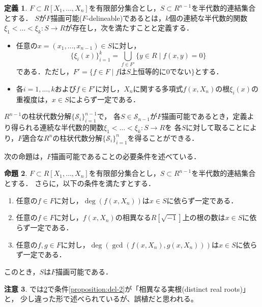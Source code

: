 \documentclass[uplatex, dvipdfmx]{jsarticle}
\numberwithin{equation}{section}
\newcommand{\map}[3]{{#1}\colon{#2}\rightarrow{#3}}
\theoremstyle{definition}
\newtheorem{definition}{定義}[section]
\newtheorem{proposition}[definition]{命題}
\newtheorem{remark}[definition]{注意}
\begin{document}
\begin{definition} 
     $F \subset R[X_1, \dots, X_n]$を有限部分集合とし，$S \subset R^{n-1}$を半代数的連結集合とする．
     $S$が$F$描画可能($F$-delineable)であるとは，$k$個の連続な半代数的関数$\map{\xi_1<\dots<\xi_k}{S}{R}$が存在し，次を満たすことと定義する．
     \begin{itemize}
          \item 任意の$ x = (x_1, \dots, x_{n-1}) \in S $に対し，
          \begin{equation}
               \{\xi_i(x)\}_{i=1}^k = \bigcup_{f \in F'}\{y \in R \mid f(x,y)=0\}
          \end{equation}
          である．ただし，$F' = \{f \in F \mid \text{$f$は$S$上恒等的に$0$でない}\}$とする．
          \item 各$i=1, \dots, k$および$f \in F'$に対し，$X_n$に関する多項式$f(x,X_n)$の根$\xi_i(x)$の重複度は，$x\in S$によらず一定である．
     \end{itemize}
\end{definition}

$R^{n-1}$の柱状代数分解$\{\mathcal{S}_i\}_{i=1}^{n-1}$で，
各$S \in \mathcal{S}_{n-1}$が$F$描画可能であるとき，定義より得られる連続な半代数的関数$\map{\xi_1<\dots<\xi_k}{S}{R}$を
各$S$に対して取ることにより，$F$適合な$R^n$の柱状代数分解$\{\mathcal{S}_i\}_{i=1}^n$を得ることができる．

次の命題は，$F$描画可能であることの必要条件を述べている．

\begin{proposition}\label{proposition:del}
     $F \subset R[X_1, \dots, X_n]$を有限部分集合とし，$S \subset R^{n-1}$を半代数的連結集合とする．
     さらに，以下の条件を満たすとする．
     \begin{enumerate}
          \item \label{proposition:del-1}
          任意の$f \in F$に対し，$\deg(f(x, X_n))$は$x \in S$に依らず一定である．
          \item \label{proposition:del-2}
          任意の$f \in F$に対し，$f(x, X_n)$の相異なる$R[\sqrt{-1}]$上の根の数は$x \in S$に依らず一定である．
          \item \label{proposition:del-3}
          任意の$f, g \in F$に対し，$\deg(\gcd(f(x, X_n), g(x, X_n)))$は$x \in S$に依らず一定である．
     \end{enumerate}
     このとき，$S$は$F$描画可能である．
\end{proposition}

\begin{remark}
     \cite[Proposition 5.14]{MR2248869}では\cref{proposition:del}で条件\ref{proposition:del-2}が「相異なる実根(distinct real roots)」と，
     少し違った形で述べられているが、誤植だと思われる。
\end{remark}
\end{document}
